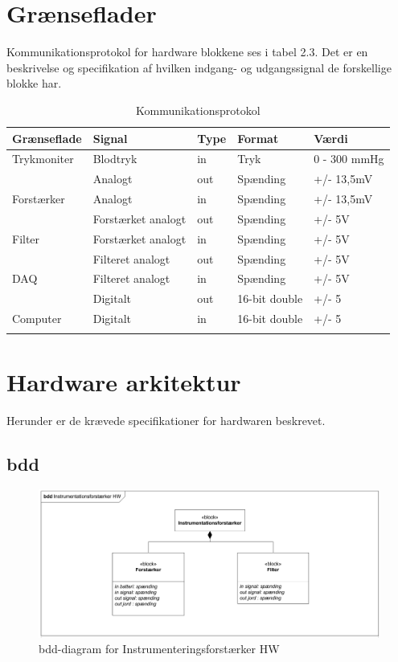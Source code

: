 \section{Grænseflader}
Kommunikationsprotokol for hardware blokkene ses i tabel 2.3. Det er en beskrivelse og specifikation af hvilken indgang- og udgangssignal de forskellige blokke har.   

\begin{longtabu} to 
	\textbf{Grænseflade} & \textbf{Signal} & \textbf{Type} & \textbf{Format} & \textbf{Værdi} \\[-1ex]
	\midrule
	Trykmoniter & Blodtryk & in & Tryk & 0 - 300 mmHg \\[-1ex]
				& Analogt & out & Spænding & +/- 13,5mV \\[-1ex]
	Forstærker  & Analogt & in & Spænding & +/- 13,5mV \\[-1ex]
				& Forstærket analogt & out & Spænding & +/- 5V \\[-1ex]
	Filter 		& Forstærket analogt & in & Spænding & +/- 5V \\				[-1ex]
				& Filteret analogt & out & Spænding & +/- 5V \\[-1ex]
	DAQ			& Filteret analogt & in & Spænding & +/- 5V \\				[-1ex]	
				& Digitalt & out & 16-bit double & +/- 5 \\[-1ex]
	Computer	& Digitalt & in & 16-bit double & +/- 5 \\[-1ex]
	\caption{Kommunikationsprotokol}	
\end{longtabu}


\section{Hardware arkitektur}
Herunder er de krævede specifikationer for hardwaren beskrevet. 
 
\subsection{bdd}

\begin{figure}[H]
	\centering
	\includegraphics[width=1\textwidth]{Figurer/Snip20151104_46}
	\caption{bdd-diagram for Instrumenteringsforstærker HW}
	\label{fig:bddhw-diagram}
\end{figure}

